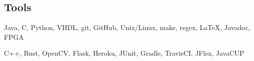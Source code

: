 \documentclass[18pt]{article}
\providecommand{\tightlist}{
    \setlength{\itemsep}{0pt}\setlength{\parskip}{0pt}
}
\begin{document}
    \subsection*{Tools}\label{languages}
    \begin{description}\tightlist
        \item[Proficient:] Java,
        C,
        Python,
        VHDL,
        git,
        GitHub,
        Unix/Linux,
        make,
        regex,
        \LaTeX,
        Javadoc,
        FPGA
        \item[Learning:] C++,
        Rust,
        OpenCV,
        Flask,
        Heroku,
        JUnit,
        Gradle,
        TravisCI,
        JFlex,
        JavaCUP
    \end{description}
\end{document}
